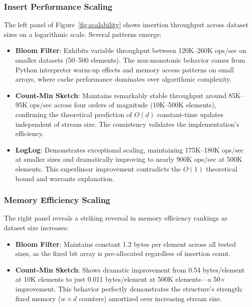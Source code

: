 \subsubsection{Insert Performance Scaling}

The left panel of Figure~\ref{fig:scalability} shows insertion throughput across dataset sizes on a logarithmic scale. Several patterns emerge:

\begin{itemize}
    \item \textbf{Bloom Filter}: Exhibits variable throughput between 120K--260K ops/sec on smaller datasets (50--500 elements). The non-monotonic behavior comes from Python interpreter warm-up effects and memory access patterns on small arrays, where cache performance dominates over algorithmic complexity.

    \item \textbf{Count-Min Sketch}: Maintains remarkably stable throughput around 85K--95K ops/sec across four orders of magnitude (10K--500K elements), confirming the theoretical prediction of $O(d)$ constant-time updates independent of stream size. The consistency validates the implementation's efficiency.

    \item \textbf{LogLog}: Demonstrates exceptional scaling, maintaining 175K--180K ops/sec at smaller sizes and dramatically improving to nearly 900K ops/sec at 500K elements. This superlinear improvement contradicts the $O(1)$ theoretical bound and warrants explanation.
\end{itemize}

\subsubsection{Memory Efficiency Scaling}

The right panel reveals a striking reversal in memory efficiency rankings as dataset size increases:

\begin{itemize}
    \item \textbf{Bloom Filter}: Maintains constant 1.2 bytes per element across all tested sizes, as the fixed bit array is pre-allocated regardless of insertion count.

    \item \textbf{Count-Min Sketch}: Shows dramatic improvement from 0.54 bytes/element at 10K elements to just 0.011 bytes/element at 500K elements---a 50$\times$ improvement. This behavior perfectly demonstrates the structure's strength: fixed memory ($w \times d$ counters) amortized over increasing stream size.
\end{itemize}

